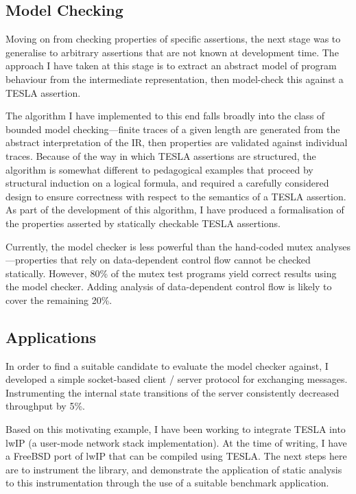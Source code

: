 \documentclass[a4paper]{article}
\begin{document}
\subsection*{Model Checking}

Moving on from checking properties of specific assertions, the next stage was to
generalise to arbitrary assertions that are not known at development time. The
approach I have taken at this stage is to extract an abstract model of program
behaviour from the intermediate representation, then model-check this against a
TESLA assertion.

The algorithm I have implemented to this end falls broadly into the class of
bounded model checking---finite traces of a given length are generated from the
abstract interpretation of the IR, then properties are validated against
individual traces. Because of the way in which TESLA assertions are structured,
the algorithm is somewhat different to pedagogical examples that proceed by
structural induction on a logical formula, and required a carefully considered
design to ensure correctness with respect to the semantics of a TESLA assertion.
As part of the development of this algorithm, I have produced a formalisation of
the properties asserted by statically checkable TESLA assertions.

Currently, the model checker is less powerful than the hand-coded mutex
analyses---properties that rely on data-dependent control flow cannot be checked
statically. However, 80\% of the mutex test programs yield correct results using
the model checker. Adding analysis of data-dependent control flow is likely to
cover the remaining 20\%.

\subsection*{Applications}

In order to find a suitable candidate to evaluate the model checker against, I
developed a simple socket-based client / server protocol for exchanging
messages. Instrumenting the internal state transitions of the server
consistently decreased throughput by 5\%.

Based on this motivating example, I have been working to integrate TESLA into
lwIP (a user-mode network stack implementation). At the time of writing, I have
a FreeBSD port of lwIP that can be compiled using TESLA. The next steps here are
to instrument the library, and demonstrate the application of static analysis to
this instrumentation through the use of a suitable benchmark application.
\end{document}
